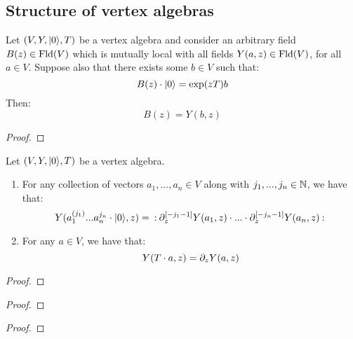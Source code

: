     \subsection{Structure of vertex algebras}
        \begin{theorem} \label{theorem: goddard_uniqueness_theorem}
            Let $(V, Y, \lvert {0} \rangle, T)$ be a vertex algebra and consider an arbitrary field $B(z) \in \mathrm{Fld}(V)$ which is mutually local with all fields $Y(a, z) \in \mathrm{Fld}(V)$, for all $a \in V$. Suppose also that there exists some $b \in V$ such that:
                $$B(z) \cdot \lvert {0} \rangle = \exp(zT) b$$
            Then:
                $$B(z) = Y(b, z)$$
        \end{theorem}
            \begin{proof}
                
            \end{proof}
        \begin{corollary}
            Let $(V, Y, \lvert {0} \rangle, T)$ be a vertex algebra.
            \begin{enumerate}
                \item For any collection of vectors $a_1, ..., a_n \in V$ along with $j_1, ..., j_n \in \mathbb{N}$, we have that:
                    $$Y( a_1^{(j_1)} ... a_n^{j_n} \cdot \lvert {0} \rangle, z ) = \: \mathbf{:} \: { \partial_z^{[-j_1 - 1]} Y(a_1, z) \cdot ... \cdot \partial_z^{[-j_n - 1]} Y(a_n, z) }  \: \mathbf{:} \:$$
                \item For any $a \in V$, we have that:
                    $$Y( T \cdot a, z ) = \partial_z Y(a, z)$$
            \end{enumerate}
        \end{corollary}
            \begin{proof}
                
            \end{proof}

        \begin{theorem} \label{theorem: vertex_algebra_reconstruction_theorem}

        \end{theorem}
            \begin{proof}
                
            \end{proof}

        \begin{theorem} \label{theorem: borcherd_OPE_formula}

        \end{theorem}
            \begin{proof}
                
            \end{proof}

